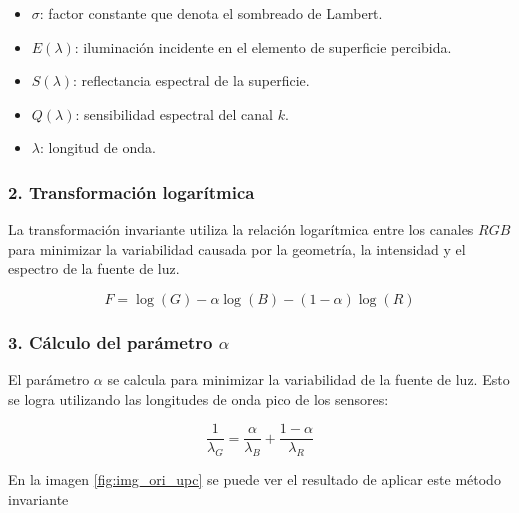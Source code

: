 \begin{itemize}
\setlength{\itemsep}{-1ex}
   \item{\begin{flushleft} $\sigma$: factor constante que denota el sombreado de Lambert. \end{flushleft}}
   \item{\begin{flushleft} $E(\lambda )$: iluminación incidente en el elemento de superficie percibida. \end{flushleft}}
   \item{\begin{flushleft} $S(\lambda )$: reflectancia espectral de la superficie. \end{flushleft}}
   \item{\begin{flushleft} $Q(\lambda )$: sensibilidad espectral del canal $k$. \end{flushleft}}
   \item{\begin{flushleft} $\lambda$: longitud de onda. \end{flushleft}}
\end{itemize}

\subsubsection{2. Transformación logarítmica}

La transformación invariante utiliza la relación logarítmica entre los canales $RGB$ para minimizar la variabilidad causada por la geometría, la intensidad y el espectro de la fuente de luz.

$$F=\log (G)-\alpha \log (B)-(1-\alpha )\log (R)$$

\subsubsection{3. Cálculo del parámetro $\alpha$}

El parámetro $\alpha$ se calcula para minimizar la variabilidad de la fuente de luz. Esto se logra utilizando las longitudes de onda pico de los sensores:

$$\frac{1}{\lambda_G }=\frac{\alpha }{\lambda_B }+\frac{1-\alpha }{\lambda_R }$$

En la imagen \ref{fig:img_ori_upc} se puede ver el resultado de aplicar este método invariante

